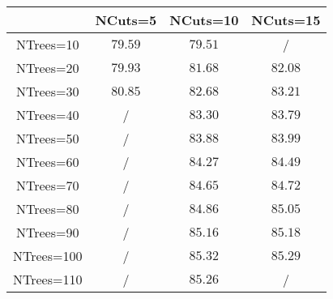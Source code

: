 \centering
\begin{tabular}{|c|c|c|c|} \hline
 & NCuts=5 & NCuts=10 & NCuts=15\\\hline
NTrees=10 & $79.59$ & $79.51$ &  /\\\hline
NTrees=20 & $79.93$ & $81.68$ & $82.08$\\\hline
NTrees=30 & $80.85$ & $82.68$ & $83.21$\\\hline
NTrees=40 &  / & $83.30$ & $83.79$\\\hline
NTrees=50 &  / & $83.88$ & $83.99$\\\hline
NTrees=60 &  / & $84.27$ & $84.49$\\\hline
NTrees=70 &  / & $84.65$ & $84.72$\\\hline
NTrees=80 &  / & $84.86$ & $85.05$\\\hline
NTrees=90 &  / & $85.16$ & $85.18$\\\hline
NTrees=100 &  / & $85.32$ & $85.29$\\\hline
NTrees=110 &  / & $85.26$ &  /\\\hline
\end{tabular}
